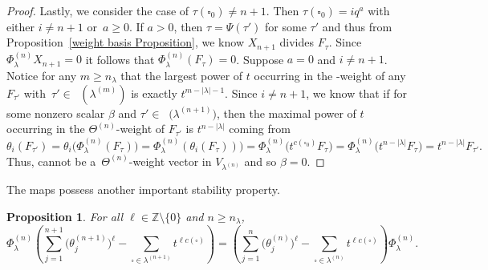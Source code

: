 \documentclass[10pt,a4paper]{amsart}
\numberwithin{equation}{section}
\newtheorem{Proposition}[Theorem]{Proposition}
\theoremstyle{definition}
\DeclareMathOperator{\PSYT}{\mathrm{PSYT}_{\geq 0}}
\begin{document}
\begin{proof}
 Lastly, we consider the case of $\tau(\square_0) \neq n+1$. Then $\tau(\square_0) = iq^a$ with either $i \neq n+1$ or~${a \geq 0}$. If $a >0$, then $\tau = \Psi(\tau')$ for some $\tau'$ and thus from Proposition~\ref{weight basis Proposition}, we know $X_{n+1}$ divides $F_{\tau}$. Since $\Phi^{(n)}_{\lambda}X_{n+1} = 0$ it follows that $\Phi^{(n)}_{\lambda}(F_{\tau}) =0$. Suppose $a = 0$ and $i \neq n+1$. Notice for any $m \geq n_{\lambda}$ that the largest power of $t$ occurring in the -weight of any $F_{\tau'}$ with~${\tau' \in \PSYT(\lambda^{(m)})}$ is exactly $t^{m-|\lambda|-1}$. Since $i \neq n+1$, we know that if  for some nonzero scalar $\beta$ and $\tau' \in \PSYT\bigl(\lambda^{(n+1)}\bigr)$, then the maximal power of $t$ occurring in the $\Theta^{(n)}$-weight of $F_{\tau'}$ is $t^{n-|\lambda|}$ coming from
 \[
 \theta_i(F_{\tau'}) = \theta_i\bigl( \Phi^{(n)}_{\lambda}(F_{\tau})\bigr)= \Phi^{(n)}_{\lambda}(\theta_i(F_{\tau})))= \Phi^{(n)}_{\lambda}\bigl( t^{c(\square_0)}F_{\tau}\bigr)= \Phi^{(n)}_{\lambda}\bigl( t^{n-|\lambda|}F_{\tau}\bigr)= t^{n-|\lambda|} F_{\tau'}.
 \]
 Thus,  cannot be a~$\Theta^{(n)}$-weight vector in $V_{\lambda^{(n)}}$ and so $\beta=0$.
\end{proof}

The maps  possess another important stability property.

\begin{Proposition}\label{connecting maps and symmetrization of thetas}
 For all $\ell \in \mathbb{Z}\setminus \{0\}$ and $n \geq n_{\lambda}$,
 \[
 \Phi^{(n)}_{\lambda}\left( \sum_{j=1}^{n+1}\bigl(\theta^{(n+1)}_j\bigr)^{\ell} - \sum_{\square \in \lambda^{(n+1)}} t^{\ell c(\square)} \right) = \left( \sum_{j=1}^{n}\bigl(\theta^{(n)}_j\bigr)^{\ell} - \sum_{\square \in \lambda^{(n)}} t^{\ell c(\square)} \right) \Phi^{(n)}_{\lambda}.
 \]

\end{Proposition}
\end{document}
